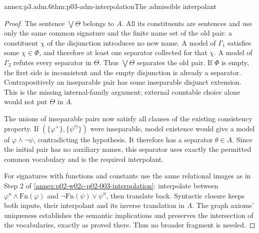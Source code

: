 \begin{annexitem}{annex:p3.adm.6}{thm:p03-adm-interpolation}{The admissible interpolant}
\begin{proof}
The sentence \(\bigvee\Theta\) belongs to \(A\). All its constituents
are sentences and use only the same common signature and the finite
name set of the old pair: a constituent \(\chi\) of the disjunction
introduces no new name. A model of \(\Gamma_1\) satisfies some
\(\chi\in\Phi\), and therefore at least one separator collected for
that \(\chi\). A model of \(\Gamma_2\) refutes every separator in
\(\Theta\). Thus \(\bigvee\Theta\) separates the old pair. If \(\Phi\)
is empty, the first side is inconsistent and the empty disjunction is
already a separator. Contrapositively an inseparable pair has some
inseparable disjunct extension. This is the missing internal-family
argument; external countable choice alone would not put \(\Theta\) in
\(A\).

The unions of inseparable pairs now satisfy all clauses of the existing
consistency property. If \((\{\varphi^+\},\{\psi^{\ominus}\})\) were
inseparable, model existence would give a model of \(\varphi\land
\neg\psi\), contradicting the hypothesis. It therefore has a separator
\(\theta\in A\). Since the initial pair has no auxiliary names, this
separator uses exactly the permitted common vocabulary and is the
required interpolant.

For signatures with functions and constants use the same relational
images as in Step 2 of
\cref{annex:p02-w02c-p02-003-interpolation}: interpolate between
\(\varphi^u\land\mathrm{Fn}(\varphi)\) and
\(\neg\mathrm{Fn}(\psi)\lor\psi^u\), then translate back. Syntactic
closure keeps both inputs, their interpolant and its inverse translation
in \(A\). The graph axioms' uniqueness establishes the semantic
implications and preserves the intersection of the vocabularies, exactly
as proved there. Thus no broader fragment is needed.
\end{proof}
\end{annexitem}

